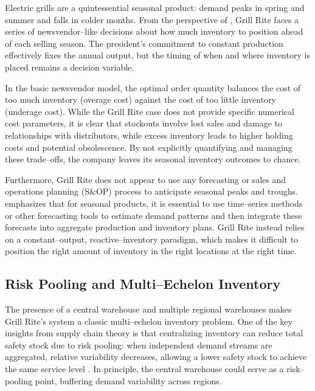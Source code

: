 \documentclass[12pt,a4paper]{article}
\begin{document}
Electric grills are a quintessential seasonal product: demand peaks in spring and summer and falls in colder months. From the perspective of \citet{cachon2018matching}, Grill Rite faces a series of newsvendor–like decisions about how much inventory to position ahead of each selling season. The president's commitment to constant production effectively fixes the annual output, but the timing of when and where inventory is placed remains a decision variable.

In the basic newsvendor model, the optimal order quantity balances the cost of too much inventory (overage cost) against the cost of too little inventory (underage cost). While the Grill Rite case does not provide specific numerical cost parameters, it is clear that stockouts involve lost sales and damage to relationships with distributors, while excess inventory leads to higher holding costs and potential obsolescence. By not explicitly quantifying and managing these trade–offs, the company leaves its seasonal inventory outcomes to chance.

Furthermore, Grill Rite does not appear to use any forecasting or sales and operations planning (S\&OP) process to anticipate seasonal peaks and troughs. \citet{stevenson2017operations} emphasizes that for seasonal products, it is essential to use time–series methods or other forecasting tools to estimate demand patterns and then integrate these forecasts into aggregate production and inventory plans. Grill Rite instead relies on a constant–output, reactive–inventory paradigm, which makes it difficult to position the right amount of inventory in the right locations at the right time.

\subsection{Risk Pooling and Multi–Echelon Inventory}

The presence of a central warehouse and multiple regional warehouses makes Grill Rite's system a classic multi–echelon inventory problem. One of the key insights from supply chain theory is that centralizing inventory can reduce total safety stock due to risk pooling: when independent demand streams are aggregated, relative variability decreases, allowing a lower safety stock to achieve the same service level \citep{simchilevi2008supplychain,cachon2018matching}. In principle, the central warehouse could serve as a risk–pooling point, buffering demand variability across regions.
\end{document}
